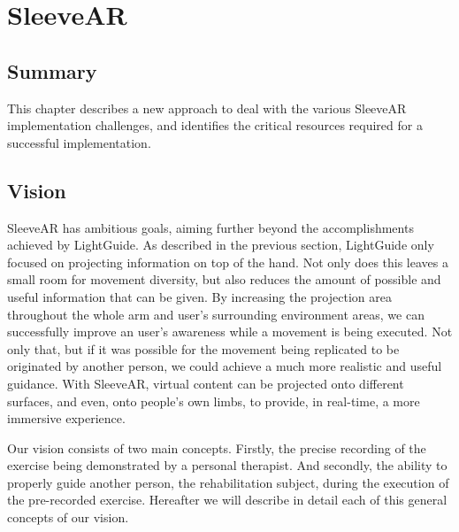 \chapter{SleeveAR}
\label{sec:sleevear}

\section*{Summary}

This chapter describes a new approach to deal with the various SleeveAR implementation challenges, and  identifies the critical resources required for a successful implementation.



\section{Vision}
\label{sec:sleevear:approach}

SleeveAR has ambitious goals, aiming further beyond the accomplishments achieved by LightGuide. 
As described in the previous section, LightGuide only focused on projecting information on top of the hand. Not only does this leaves a small room for movement diversity, but also reduces the amount of possible and useful information that can be given.
By increasing the projection area throughout the whole arm and user's surrounding environment areas, we can successfully improve an user's awareness while a movement is being executed. 
 Not only that, but if it was possible for the movement being replicated to be originated by another person, we could achieve a much more realistic and useful guidance.
With SleeveAR, virtual content can be projected onto different surfaces, and even, onto people's own limbs, to provide, in real-time, a more immersive experience. 

Our vision consists of two main concepts. Firstly, the precise recording of the exercise being demonstrated by a personal therapist. 
And secondly, the ability to properly guide another person, the rehabilitation subject, during the execution of the pre-recorded exercise.
Hereafter we will describe in detail each of this general concepts of our vision.

